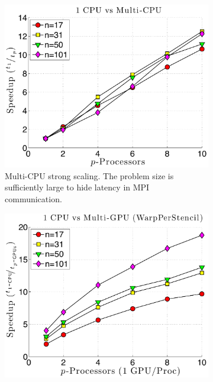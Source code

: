 \begin{figure}
\centering
\begin{subfigure}[t]{0.425\textwidth}
\centering
\includegraphics[width=1.0\textwidth]{../figures/keeneland_results/alltoallv_cosine/speedup_1CPU_vs_NCPU.pdf}
\caption{Multi-CPU strong scaling. The problem size is sufficiently large to hide latency in MPI communication.}
\label{fig:alltoall_multicpu_scaling}
\end{subfigure} 
\begin{subfigure}[t]{0.425\textwidth}
\centering
\includegraphics[width=1.0\textwidth]{../figures/keeneland_results/alltoallv_cosine/speedup_1CPU_vs_NGPU_WarpPerStencil.pdf}

\end{subfigure}
\end{figure}
